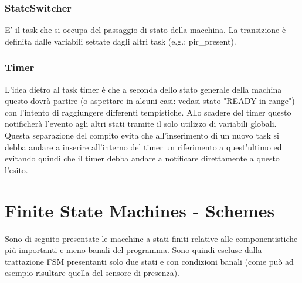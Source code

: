 \documentclass{article}
\begin{document}
\subsubsection{StateSwitcher}
E' il task che si occupa del passaggio di stato della macchina. La transizione è definita dalle variabili settate dagli altri task (e.g.: pir\_present).

\subsubsection{Timer}
L'idea dietro al task timer è che a seconda dello stato generale della machina questo dovrà partire (o aspettare in alcuni casi: vedasi stato "READY in range") con l'intento di raggiungere differenti tempistiche. Allo scadere del timer questo notificherà l'evento agli altri stati tramite il solo utilizzo di variabili globali. Questa separazione del compito evita che all'inserimento di un nuovo task si debba andare a inserire all'interno del timer un riferimento a quest'ultimo ed evitando quindi che il timer debba andare a notificare direttamente a questo l'esito.

\newpage

\section{Finite State Machines - Schemes}
Sono di seguito presentate le macchine a stati finiti relative alle componentistiche più importanti e meno banali del programma. Sono quindi escluse dalla trattazione FSM presentanti solo due stati e con condizioni banali (come può ad esempio risultare quella del sensore di presenza).
\end{document}
